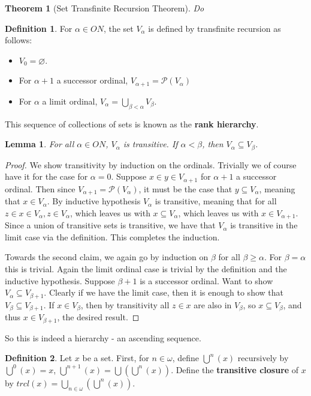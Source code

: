 \documentclass{article}
\theoremstyle{definition}
\newtheorem{definition}{Definition}[section]
\theoremstyle{plain}
\theoremstyle{theorem}
\newtheorem{lemma}{Lemma}[section]
\newtheorem{theorem}{Theorem}[section]
\begin{document}
\begin{theorem}[Set Transfinite Recursion Theorem]
Do
\end{theorem}
\begin{definition}
	For $\alpha \in ON$, the set $V_{\alpha}$ is defined by transfinite recursion as follows:
	\begin{itemize}
		\item[1] $V_0 = \varnothing$.
		\item[2] For $\alpha+1$ a successor ordinal, $V_{\alpha+1} = \mathcal{P}(V_{\alpha})$
		\item[3] For $\alpha$ a limit ordinal, $V_{\alpha} = \bigcup_{\beta < \alpha} V_{\beta}$. 
	\end{itemize}
	This sequence of collections of sets is known as the \textbf{rank hierarchy}.
\end{definition}
\begin{lemma}
	For all $\alpha \in ON$, $V_{\alpha}$ is transitive. If $\alpha < \beta$, then $V_{\alpha} \subseteq V_{\beta}$. 
\end{lemma}
\begin{proof}
	We show transitivity by induction on the ordinals. Trivially we of course have it for the case for $\alpha = 0$. Suppose $x \in y \in V_{\alpha+1}$ for $\alpha+1$ a successor ordinal. Then since $V_{\alpha+1} = \mathcal{P}(V_{\alpha})$, it must be the case that $y \subseteq V_{\alpha}$, meaning that $x \in V_{\alpha}$. By inductive hypothesis $V_{\alpha}$ is transitive, meaning that for all $z \in x \in V_{\alpha}, z \in V_{\alpha}$, which leaves us with $x \subseteq V_{\alpha}$, which leaves us with $x \in V_{\alpha+1}$. Since a union of transitive sets is transitive, we have that $V_{\alpha}$ is transitive in the limit case via the definition. This completes the induction. \par 
	Towards the second claim, we again go by induction on $\beta$ for all $\beta \geq \alpha$. For $\beta = \alpha$ this is trivial. Again the limit ordinal case is trivial by the definition and the inductive hypothesis. Suppose $\beta+1$ is a successor ordinal. Want to show $V_{\alpha} \subseteq V_{\beta+1}$. Clearly if we have the limit case, then it is enough to show that $V_{\beta} \subseteq V_{\beta+1}$. If $x \in V_{\beta}$, then by transitivity all $z \in x$ are also in $V_{\beta}$, so $x \subseteq V_{\beta}$, and thus $x \in V_{\beta+1}$, the desired result.
\end{proof}
So this is indeed a hierarchy - an ascending sequence. 
\begin{definition}
	Let $x$ be a set. First, for $n \in \omega$, define $\bigcup^n(x)$ recursively by $\bigcup^0(x) = x$, $\bigcup^{n+1}(x) = \bigcup\left(\bigcup^n(x)\right)$. Define the \textbf{transitive closure} of $x$ by $trcl(x) = \bigcup_{n \in \omega} \left( \bigcup^n(x) \right)$. 
\end{definition}
\end{document}
